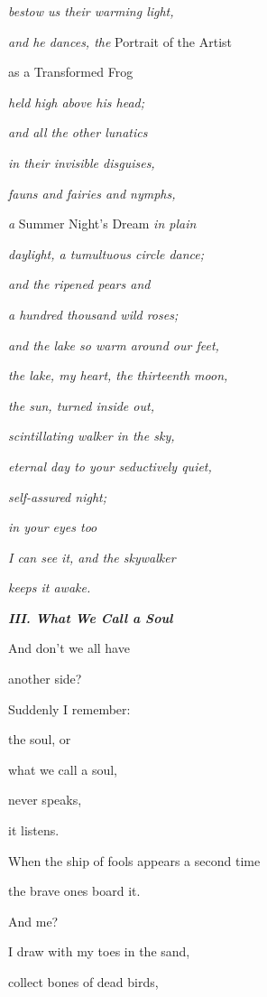 \emph{
bestow us their warming light,}

\emph{and he dances, the }Portrait of the Artist

as a Transformed Frog

\emph{
held high above his head;}

\emph{
and all the other lunatics}

\emph{
in their invisible disguises,}

\emph{
fauns and fairies and nymphs,}

\emph{a }Summer Night's Dream \emph{in plain}

\emph{
daylight, a tumultuous circle dance;}

\emph{
and the ripened pears and}

\emph{
a hundred thousand wild roses;}

\emph{
and the lake so warm around our feet,}

\emph{
the lake, my heart, the thirteenth moon, }

\emph{
the sun, turned inside out,}

\emph{
scintillating walker in the sky, }

\emph{
eternal day to your seductively quiet,}

\emph{
self-assured night; }

\emph{
in your eyes too}

\emph{
I can see it, and the skywalker}

\emph{
keeps it awake.}


\bigskip

{\bfseries\itshape
III. What We Call a Soul}


\bigskip

And don't we all have

another side?


\bigskip

Suddenly I remember:

the soul, or

what we call a soul,

never speaks,

it listens.


\bigskip

When the ship of fools appears a second time

the brave ones board it.

And me? 


\bigskip

I draw with my toes in the sand,

collect bones of dead birds,

